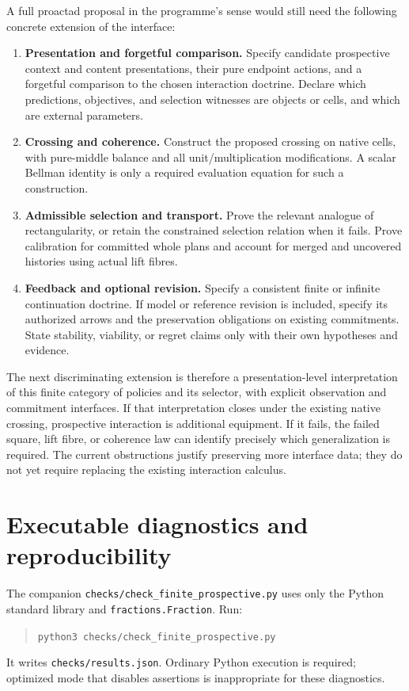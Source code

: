 \documentclass[11pt]{article}
\theoremstyle{definition}
\begin{document}
A full proactad proposal in the programme's sense would still need the
following concrete extension of the interface:
\begin{enumerate}[label=(\roman*)]
\item \textbf{Presentation and forgetful comparison.}
Specify candidate prospective context and content presentations, their
pure endpoint actions, and a forgetful comparison to the chosen interaction
doctrine. Declare which predictions, objectives, and selection witnesses
are objects or cells, and which are external parameters.
\item \textbf{Crossing and coherence.}
Construct the proposed crossing on native cells, with pure-middle balance
and all unit/multiplication modifications. A scalar Bellman identity is
only a required evaluation equation for such a construction.
\item \textbf{Admissible selection and transport.}
Prove the relevant analogue of rectangularity, or retain the constrained
selection relation when it fails. Prove calibration for committed whole
plans and account for merged and uncovered histories using actual lift
fibres.
\item \textbf{Feedback and optional revision.}
Specify a consistent finite or infinite continuation doctrine. If model
or reference revision is included, specify its authorized arrows and the
preservation obligations on existing commitments. State stability, viability, or regret
claims only with their own hypotheses and evidence.
\end{enumerate}

The next discriminating extension is therefore a presentation-level
interpretation of this finite category of policies and its selector,
with explicit observation and commitment interfaces. If that
interpretation closes under the existing native crossing, prospective
interaction is additional equipment. If it fails, the failed square,
lift fibre, or coherence law can identify precisely which generalization
is required. The current obstructions justify preserving more interface
data; they do not yet require replacing the existing interaction calculus.

\appendix
\section{Executable diagnostics and reproducibility}
\label{sec:checks}
The companion \texttt{checks/check\_finite\_prospective.py} uses only the
Python standard library and \texttt{fractions.Fraction}. Run:
\begin{quote}
\texttt{python3 checks/check\_finite\_prospective.py}
\end{quote}
It writes \texttt{checks/results.json}. Ordinary Python execution is
required; optimized mode that disables assertions is inappropriate for
these diagnostics.
\end{document}
